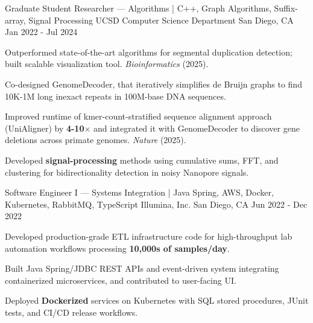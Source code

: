 \documentclass[11pt, a4paper]{awesome-cv}
\begin{document}
\begin{cventries}
  \cventry
    {Graduate Student Researcher — Algorithms | C++, Graph Algorithms, Suffix-array, Signal Processing}
    {UCSD Computer Science Department}
    {San Diego, CA}
    {Jan 2022 - Jul 2024}
    {
      \begin{cvitems}
        \item {Outperformed state-of-the-art algorithms for segmental duplication detection; built scalable visualization tool. \textit{Bioinformatics} (2025).}
        \item {Co-designed GenomeDecoder, that iteratively simplifies de Bruijn graphs to find 10K-1M long inexact repeats in 100M-base DNA sequences.}
        \item {Improved runtime of kmer-count-stratified sequence alignment approach (UniAligner) by \textbf{4-10$\times$} and integrated it with GenomeDecoder to discover gene deletions across primate genomes. \textit{Nature} (2025).}
        \item {Developed \textbf{signal-processing} methods using cumulative sums, FFT, and clustering for bidirectionality detection in noisy Nanopore signals.}
      \end{cvitems}
    }
    
  \cventry
    {Software Engineer I — Systems Integration | Java Spring, AWS, Docker, Kubernetes, RabbitMQ, TypeScript}
    {Illumina, Inc.}
    {San Diego, CA}
    {Jun 2022 - Dec 2022}
    {
      \begin{cvitems}
        \item {Developed production-grade ETL infrastructure code for high-throughput lab automation workflows processing \textbf{10{,}000s of samples/day}.}
        \item {Built Java Spring/JDBC REST APIs and event-driven system integrating containerized microservices, and contributed to user-facing UI.}
        \item {Deployed \textbf{Dockerized} services on Kubernetes with SQL stored procedures, JUnit tests, and CI/CD release workflows.}
      \end{cvitems}
    }


\end{cventries}
\end{document}
